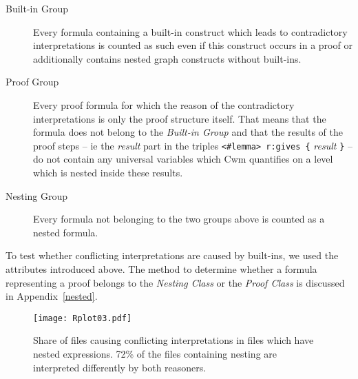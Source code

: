 \begin{description}
\item[Built-in Group] Every formula containing a built-in construct which leads to contradictory interpretations
is counted as such even if this construct occurs in a proof or additionally contains nested graph constructs without built-ins.
\item[Proof Group]
Every proof formula for which the reason of the contradictory interpretations is only the proof structure itself. 
That means that the formula does not belong to the \emph{Built-in Group} and that the results of the proof 
steps -- ie the \textit{result} part in the triples \texttt{<\#lemma> r:gives \{} \textit{result} \texttt{\}} -- do not contain any universal variables which 
Cwm quantifies on a level which is nested inside these results.
\item[Nesting Group]
Every formula not belonging to the two groups above is counted as a nested formula.
\end{description}

To test whether conflicting interpretations are caused by built-ins, we used the attributes introduced above. 
The method to determine whether a formula representing a proof belongs to the \emph{Nesting Class} or the \emph{Proof Class}  is discussed in Appendix~\ref{nested}. 


\begin{figure}
 \texttt{[image: Rplot03.pdf]}
 \caption{Share of files causing conflicting interpretations in
 files which have nested expressions. 72\% of the files containing nesting are interpreted differently by both reasoners.
\label{onlynests}}
\end{figure}

